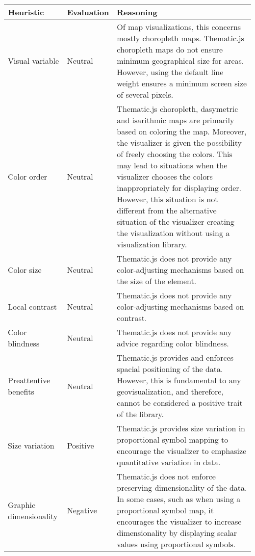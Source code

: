 \begin{longtable}{|p{3cm}|p{2.2cm}|p{7.8cm}|}
\hline
\textbf{Heuristic} & \textbf{Evaluation} & \textbf{Reasoning} \\
\hline
\endhead
\hline
\endfoot
\endlastfoot
Visual variable & Neutral & Of map visualizations, this concerns mostly choropleth maps. Thematic.js choropleth maps do not ensure minimum geographical size for areas. However, using the default line weight ensures a minimum screen size of several pixels. \\[0.5em] %
Color order & Neutral & Thematic.js choropleth, dasymetric and isarithmic maps are primarily based on coloring the map. Moreover, the visualizer is given the possibility of freely choosing the colors. This may lead to situations when the visualizer chooses the colors inappropriately for displaying order. However, this situation is not different from the alternative situation of the visualizer creating the visualization without using a visualization library. \\[0.5em] %
Color size & Neutral & Thematic.js does not provide any color-adjusting mechanisms based on the size of the element. \\[0.5em] %
Local contrast & Neutral & Thematic.js does not provide any color-adjusting mechanisms based on contrast. \\[0.5em] %
Color blindness & Neutral & Thematic.js does not provide any advice regarding color blindness. \\[0.5em] %
Preattentive benefits & Neutral & Thematic.js provides and enforces spacial positioning of the data. However, this is fundamental to any geovisualization, and therefore, cannot be considered a positive trait of the library. \\[0.5em] %
Size variation & Positive & Thematic.js provides size variation in proportional symbol mapping to encourage the visualizer to emphasize quantitative variation in data. \\[0.5em] %
Graphic dimensionality & Negative & Thematic.js does not enforce preserving dimensionality of the data. In some cases, such as when using a proportional symbol map, it encourages the visualizer to increase dimensionality by displaying scalar values using proportional symbols. \\[0.5em] %

\end{longtable}
